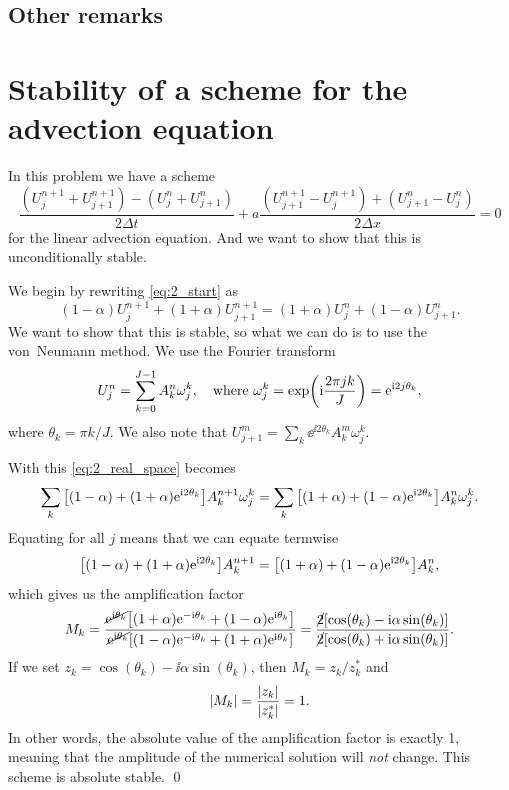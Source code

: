\documentclass[11pt,letter, swedish, english
]{article}
\newcommand{\Dx}{\ensuremath{\Delta{x}}}
\newcommand{\Dt}{\ensuremath{\Delta{t}}}
\begin{document}
\clearpage
\restoregeometry
\addtocounter{subsection}{4}
\subsection{Other remarks}



\section{Stability of a scheme for the advection equation}
In this problem we have a scheme
\begin{equation}\label{eq:2_start}
\frac{(U_j^{n+1}+U_{j+1}^{n+1})-(U_j^n+U_{j+1}^n)}{2\Dt}
+a\frac{(U_{j+1}^{n+1}-U_{j}^{n+1})+(U_{j+1}^n-U_j^n)}{2\Dx}=0
\end{equation}
for the linear advection equation. And we want to show that this is
unconditionally stable.

We begin by rewriting \eqref{eq:2_start} as
\begin{equation}\label{eq:2_real_space}
(1-\alpha)U_{j}^{n+1}+(1+\alpha)U_{j+1}^{n+1}
=(1+\alpha)U_{j}^{n}+(1-\alpha)U_{j+1}^{n}.
\end{equation}
We want to show that this is stable, so what we can do is to use the
von~Neumann method. We use the Fourier transform
\begin{equation}
U_j^n=\sum_{k=0}^{J-1} A_k^n\omega_j^k
\qcomma\text{where } \omega_j^k=\exp(\ii\frac{2\pi jk}{J})=\ee^{\ii2j\theta_k},
\end{equation}
where $\theta_k=\pi k/J$. We also note that 
$U_{j+1}^m=\sum_k \ee^{\ii2\theta_k}A_k^m\omega_j^k$.

With this \eqref{eq:2_real_space} becomes
\begin{equation}
\sum_k\qty[(1-\alpha)+(1+\alpha)\mathrm{e}^{\mathrm{i}2\theta_k}]
A_k^{n+1}\omega_j^k
=\sum_k\qty[(1+\alpha)+(1-\alpha)\mathrm{e}^{\mathrm{i}2\theta_k}]
A_k^{n}\omega_j^k.
\end{equation}
Equating for all $j$ means that we can equate termwise
\begin{equation}
\qty[(1-\alpha)+(1+\alpha)\mathrm{e}^{\mathrm{i}2\theta_k}]A_k^{n+1}
=\qty[(1+\alpha)+(1-\alpha)\mathrm{e}^{\mathrm{i}2\theta_k}]A_k^{n},
\end{equation}
which gives us the amplification factor
\begin{equation}
M_k=\frac{\cancel{\mathrm{e}^{\mathrm{i}\theta_k}}
\qty[(1+\alpha)\mathrm{e}^{-\mathrm{i}\theta_k}+(1-\alpha)\mathrm{e}^{\mathrm{i}\theta_k}]}
{\cancel{\mathrm{e}^{\mathrm{i}\theta_k}}
\qty[(1-\alpha)\mathrm{e}^{-\mathrm{i}\theta_k}+(1+\alpha)\mathrm{e}^{\mathrm{i}\theta_k}]}
=\frac{\cancel{2}\qty[\cos(\theta_k)-\mathrm{i}\alpha\sin(\theta_k)]}
{\cancel{2}\qty[\cos(\theta_k)+\mathrm{i}\alpha\sin(\theta_k)]}.
\end{equation}
If we set $z_k=\cos(\theta_k)-\ii\alpha\sin(\theta_k)$, then
$M_k=z_k/z_k^*$ and 
\begin{equation}
\abs{M_k}=\frac{|z_k|}{|z_k^*|}=1.
\end{equation}
In other words, the absolute value of the amplification factor is
exactly 1, meaning that the amplitude of the numerical solution will
\emph{not} change. This scheme is absolute stable. \qed
\end{document}
